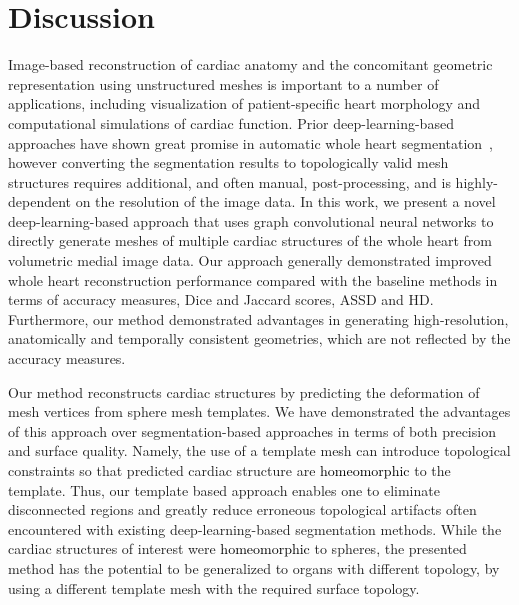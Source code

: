 \documentclass[times,review,preprint,authoryear]{elsarticle}
\begin{document}
\section{Discussion}


Image-based reconstruction of cardiac anatomy and the concomitant geometric representation using unstructured meshes is important to a number of applications, including visualization of patient-specific heart morphology and computational simulations of cardiac function. Prior deep-learning-based approaches have shown great promise in automatic whole heart segmentation~\citep{ZHUANG2019}, however converting the segmentation results to topologically valid mesh structures requires additional, and often manual, post-processing, and is highly-dependent on the resolution of the image data.  In this work, we present a novel deep-learning-based approach that uses graph convolutional neural networks to directly generate meshes of multiple cardiac structures of the whole heart from volumetric medial image data. Our approach generally demonstrated improved whole heart reconstruction performance compared with the baseline methods in terms of accuracy measures, Dice and Jaccard scores, ASSD and HD. Furthermore, our method demonstrated advantages in generating high-resolution, anatomically and temporally consistent geometries, which are not reflected by the accuracy measures. 

Our method reconstructs cardiac structures by predicting the deformation of mesh vertices from sphere mesh templates. We have demonstrated the advantages of this approach over segmentation-based approaches in terms of both precision and surface quality. Namely, the use of a template mesh can introduce topological constraints so that predicted cardiac structure are \textcolor{black}{homeomorphic} to the template. Thus, our template based approach enables one to eliminate disconnected regions and greatly reduce erroneous topological artifacts often encountered with existing deep-learning-based segmentation methods. While the cardiac structures of interest were \textcolor{black}{homeomorphic} to spheres, the presented method has the potential to be generalized to organs with different topology, by using a different template mesh with the required surface topology. 
\end{document}
